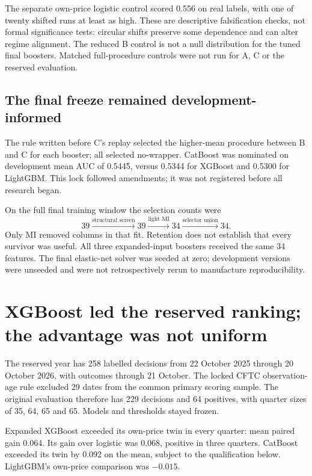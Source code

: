 \documentclass[11pt,a4paper]{article}
\begin{document}
The separate own-price logistic control scored 0.556 on real labels, with one of twenty shifted runs at least as high. These are descriptive falsification checks, not formal significance tests: circular shifts preserve some dependence and can alter regime alignment. The reduced B control is not a null distribution for the tuned final boosters. Matched full-procedure controls were not run for A, C or the reserved evaluation.

\subsection*{The final freeze remained development-informed}
The rule written before C's replay selected the higher-mean procedure between B and C for each booster; all selected no-wrapper. CatBoost was nominated on development mean AUC of 0.5445, versus 0.5344 for XGBoost and 0.5300 for LightGBM. This lock followed amendments; it was not registered before all research began.

On the full final training window the selection counts were
\[
39\xrightarrow{\text{structural screen}}39
\xrightarrow{\text{light MI}}34
\xrightarrow{\text{selector union}}34.
\]
Only MI removed columns in that fit. Retention does not establish that every survivor was useful. All three expanded-input boosters received the same 34 features. The final elastic-net solver was seeded at zero; development versions were unseeded and were not retrospectively rerun to manufacture reproducibility.

\nextpage
\section*{XGBoost led the reserved ranking; the advantage was not uniform}
The reserved year has 258 labelled decisions from 22 October 2025 through 20 October 2026, with outcomes through 21 October. The locked CFTC observation-age rule excluded 29 dates from the common primary scoring sample. The original evaluation therefore has 229 decisions and 64 positives, with quarter sizes of 35, 64, 65 and 65. Models and thresholds stayed frozen.



Expanded XGBoost exceeded its own-price twin in every quarter: mean paired gain 0.064. Its gain over logistic was 0.068, positive in three quarters. CatBoost exceeded its twin by 0.092 on the mean, subject to the qualification below. LightGBM's own-price comparison was $-0.015$.
\end{document}
